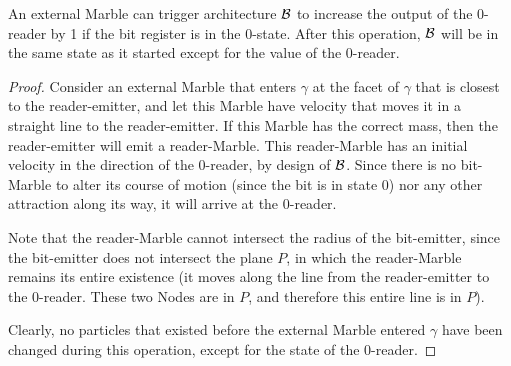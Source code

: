 \begin{lemma}
    An external Marble can trigger architecture $\mathcal{B}$ to increase the output of the 0-reader by 1 if the bit register is in the 0-state. After this operation, $\mathcal{B}$ will be in the same state as it started except for the value of the 0-reader.
    \label{lemma:0-reader}
\end{lemma}
\begin{proof}
    Consider an external Marble that enters $\gamma$ at the facet of $\gamma$ that is closest to the reader-emitter, and let this Marble have velocity that moves it in a straight line to the reader-emitter. If this Marble has the correct mass, then the reader-emitter will emit a reader-Marble. This reader-Marble has an initial velocity in the direction of the 0-reader, by design of $\mathcal{B}$. Since there is no bit-Marble to alter its course of motion (since the bit is in state 0) nor any other attraction along its way, it will arrive at the 0-reader. 
    
    Note that the reader-Marble cannot intersect the radius of the bit-emitter, since the bit-emitter does not intersect the plane $P$, in which the reader-Marble remains its entire existence (it moves along the line from the reader-emitter to the 0-reader. These two Nodes are in $P$, and therefore this entire line is in $P$).
    
    Clearly, no particles that existed before the external Marble entered $\gamma$ have been changed during this operation, except for the state of the 0-reader.
\end{proof}

